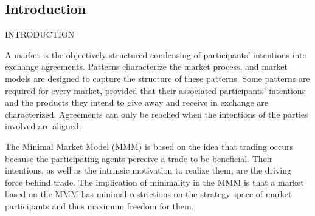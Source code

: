 \documentclass[unknownkeysallowed, compress]{beamer}
\theoremstyle{plain}
\begin{document}
\subsection{Introduction}
\begin{frame}{INTRODUCTION}

\par A market is the objectively structured condensing of participants' intentions into exchange agreements. Patterns characterize the market process, and market models are designed to capture the structure of these patterns. Some patterns are required for every market, provided that their associated participants' intentions and the products they intend to give away and receive in exchange are characterized. Agreements can only be reached when the intentions of the parties involved are aligned.\\

\par The Minimal Market Model (MMM) is based on the idea that trading occurs because the participating agents perceive a trade to be beneficial. Their intentions, as well as the intrinsic motivation to realize them, are the driving force behind trade. The implication of minimality in the MMM is that a market based on the MMM has minimal restrictions on the strategy space of market participants and thus maximum freedom for them.



\end{frame}
\end{document}
